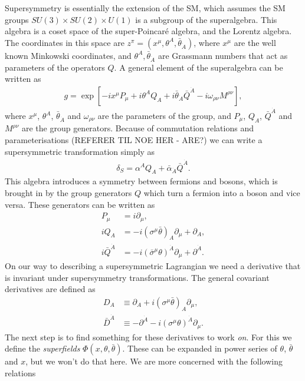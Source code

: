 \documentclass[twoside,english]{uiofysmaster}
\begin{document}
Supersymmetry is essentially the extension of the SM, which assumes the SM groups $SU(3) \times SU(2) \times U(1)$ is a subgroup of the superalgebra. This algebra is a coset space of the super-Poincar\'{e} algebra, and the Lorentz algebra. The coordinates in this space are $z^{\pi} = (x^{\mu}, \theta^A, \bar{\theta}_{\dot{A}})$, where $x^{\mu}$ are the well known Minkowski coordinates, and $\theta^A, \bar{\theta}_{\dot{A}}$ are Grassmann numbers that act as parameters of the operators $Q$. A general element of the superalgebra can be written as 
\begin{align}
g = \exp [- ix^{\mu} P_{\mu} + i \theta^A Q_A + i \bar{\theta}_{\dot{A}} \bar{Q}^{\dot{A}} - i \omega_{\rho \nu} M^{\rho \nu}],
\end{align}
where $x^{\mu}$, $\theta^A$, $\bar{\theta}_{\dot{A}}$ and $\omega_{\rho \nu}$ are the parameters of the group, and $P_{\mu}$, $Q_A$, $\bar{Q}^{\dot{A}}$ and $M^{\rho \nu}$ are the group generators. Because of commutation relations and parameterisations (REFERER TIL NOE HER - ARE?) we can write a supersymmetric transformation simply as 
\begin{align}
\delta_S = \alpha^A Q_A + \bar{\alpha}_{\dot{A}} \bar{Q}^{\dot{A}}.
\end{align}
This algebra introduces a symmetry between fermions and bosons, which is brought in by the group generators $Q$ which turn a fermion into a boson and vice versa. These generators can be written as 
\begin{align}
P_{\mu} &= i \partial_{\mu},\\
iQ_A &= -i (\sigma^{\mu} \bar{\theta})_A \partial_{\mu} + \partial_A,\\
i \bar{Q}^{\dot{A}} &= -i (\bar{\sigma}^{\mu} \theta)^{\dot{A}} \partial_{\mu} + \partial^{\dot{A}}.
\end{align}
On our way to describing a supersymmetric Lagrangian we need a derivative that is invariant under supersymmetry transformations. The general covariant derivatives are defined as
\begin{align}
D_A & \equiv \partial_A + i (\sigma^{\mu} \bar{\theta})_A \partial_{\mu},\\
\bar{D}^{\dot{A}} & \equiv -\partial^{\dot{A}} - i (\sigma^{\mu} \theta)^{\dot{A}} \partial_{\mu}.
\end{align}
The next step is to find something for these derivatives to work \textit{on}. For this we define the \textit{superfields} $\Phi(x, \theta, \bar{\theta})$. These can be expanded in power series of $\theta$, $\bar{\theta}$ and $x$, but we won't do that here. We are more concerned with the following relations
\end{document}
